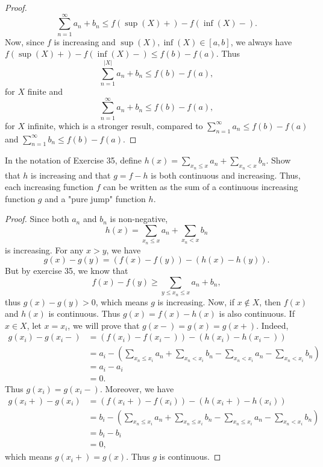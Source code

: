 \documentclass[12pt, a4paper]{article}
\theoremstyle{plain}
\begin{document}
\begin{proof}
	\[
	\sum_{n=1}^{\infty}{a_n+b_n}\leq f(\sup(X)+)-f(\inf(X)-).
	\]
	Now, since $f$ is increasing and $\sup(X),\inf(X)\in [a,b]$, we always have $f(\sup(X)+)-f(\inf(X)-)\leq f(b)-f(a)$. Thus
	\[
	\sum_{n=1}^{|X|}{a_n+b_n}\leq f(b)-f(a),
	\]
	for $X$ finite and
	\[
	\sum_{n=1}^{\infty}{a_n+b_n}\leq f(b)-f(a),
	\]
	for $X$ infinite, which is a stronger result, compared to $\sum_{n=1}^\infty a_n\leq f(b)-f(a)$ and $\sum_{n=1}^{\infty}b_n\leq f(b)-f(a)$. 
	\end{proof}
	
\begin{exercise}{36}
In the notation of Exercise 35, define $h(x)=\sum_{x_n\leq x}a_n+\sum_{x_n<x}{b_n}$. Show that $h$ is increasing and that $g = f - h$ is both continuous and increasing. Thus, each increasing function $f$ can be written as the sum of a continuous increasing function
$g$ and a "pure jump" function $h$.
\end{exercise}
	\begin{proof}
	Since both $a_n$ and $b_n$ is non-negative,
	\[
	h(x)=\sum_{x_n\leq x}a_n+\sum_{x_n<x}{b_n}
	\]
	is increasing. For any $x>y$, we have 
	\[
	g(x)-g(y)=(f(x)-f(y))-(h(x)-h(y)).
	\]
	But by exercise 35, we know that
	\[
	f(x)-f(y)\geq \sum_{y\leq x_n\leq x}{a_n+b_n},
	\]
	thus $g(x)-g(y)>0$, which means $g$ is increasing. Now, if $x\notin X$, then $f(x)$ and $h(x)$ is continuous. Thus $g(x)=f(x)-h(x)$ is also continuous. If $x\in X$, let $x=x_i$, we will prove that $g(x-)=g(x)=g(x+)$. Indeed,
	\begin{align*}
	g(x_i)-g(x_i-)&=(f(x_i)-f(x_i-))-(h(x_i)-h(x_i-))\\
	&=a_i-(\sum_{x_n\leq x_i}a_n+\sum_{x_n< x_i}b_n-\sum_{x_n< x_i}a_n-\sum_{x_n< x_i}b_n)\\
	&=a_i-a_i\\
	&=0.
	\end{align*}
	Thus $g(x_i)=g(x_i-)$. Moreover, we have
	\begin{align*}
	g(x_i+)-g(x_i)&=(f(x_i+)-f(x_i))-(h(x_i+)-h(x_i))\\
	&=b_i-(\sum_{x_n\leq x_i}a_n+\sum_{x_n\leq x_i}b_n-\sum_{x_n\leq x_i}a_n-\sum_{x_n< x_i}b_n)\\
	&=b_i-b_i\\
	&=0,
	\end{align*}
	which means $g(x_i+)=g(x)$. Thus $g$ is continuous.
	\end{proof}
\end{document}
